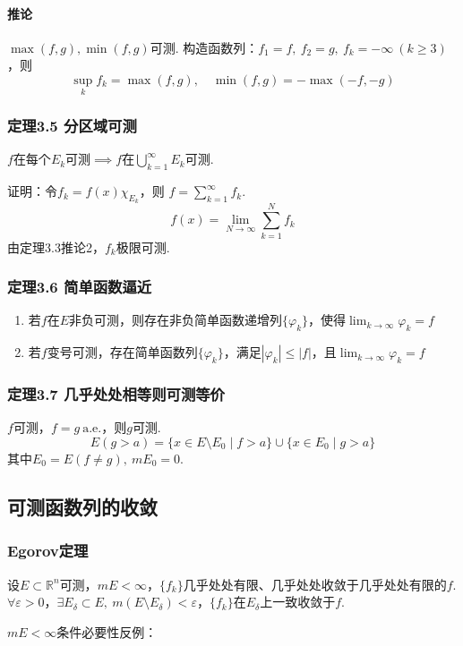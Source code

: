 \documentclass{article}
\begin{document}
	\paragraph{推论}
	$\max(f,g),\min(f,g)$可测.
	构造函数列：$f_1=f,\ f_2=g,\ f_k=-\infty\ (k\ge3)$，则
	\[
	\sup_k f_k=\max(f,g),\quad \min(f,g)=-\max(-f,-g)
	\]
	
	\subsubsection{定理3.5 分区域可测}
	$f$在每个$E_k$可测$\implies f$在$\bigcup\limits_{k=1}^{\infty}E_k$可测.
	
	证明：令$f_k=f(x)\chi_{E_k}$，则 $f=\sum\limits_{k=1}^{\infty}f_k$.
	\[
	f(x)=\lim_{N\to\infty}\sum_{k=1}^{N}f_k
	\]
	由定理3.3推论2，$f_k$极限可测.
	
	\subsubsection{定理3.6 简单函数逼近}
	\begin{enumerate}
		\item 若$f$在$E$非负可测，则存在非负简单函数递增列$\{\varphi_k\}$，使得$\displaystyle \lim_{k\to\infty}\varphi_k=f$
		\item 若$f$变号可测，存在简单函数列$\{\varphi_k\}$，满足$|\varphi_k|\le|f|$，且$\displaystyle \lim_{k\to\infty}\varphi_k=f$
	\end{enumerate}
	
	\subsubsection{定理3.7 几乎处处相等则可测等价}
	$f$可测，$f=g\ \text{a.e.}$，则$g$可测.
	\[
	E(g>a)=\{x\in E\setminus E_0\mid f>a\}\cup\{x\in E_0\mid g>a\}
	\]
	其中$E_0=E(f\ne g),\ mE_0=0$.
	
	\subsection{可测函数列的收敛}
	\subsubsection{Egorov定理}
	设$E\subset\mathbb{R}^n$可测，$mE<\infty$，$\{f_k\}$几乎处处有限、几乎处处收敛于几乎处处有限的$f$.
	$\forall \varepsilon>0$，$\exists E_\delta\subset E,\ m(E\setminus E_\delta)<\varepsilon$，$\{f_k\}$在$E_\delta$上一致收敛于$f$.
	
	$mE<\infty$条件必要性反例：
	
\end{document}
